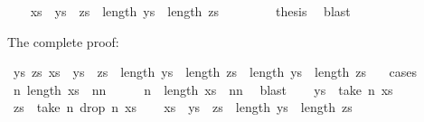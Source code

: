 \begin{isabellebody}
\ \ \isamarkupfalse%
\ {\isachardoublequoteopen}xs\ {\isacharequal}{\kern0pt}\ {\isacharquery}{\kern0pt}ys\ {\isacharat}{\kern0pt}\ {\isacharquery}{\kern0pt}zs\ {\isasymand}\ length\ {\isacharquery}{\kern0pt}ys\ {\isacharequal}{\kern0pt}\ length\ {\isacharquery}{\kern0pt}zs\ {\isacharplus}{\kern0pt}\ {}{\isachardoublequoteclose}\ \isamarkupfalse%
\isanewline
\ \ \isamarkupfalse%
\ \isamarkupfalse%
\ {\isacharquery}{\kern0pt}thesis\ \isamarkupfalse%
\ blast\isanewline
{}\isamarkupfalse%
%
\endisatagproof
{\isafoldproof}%
%
\isadelimproof
%
\endisadelimproof
%
\begin{isamarkuptext}%
The complete proof:%
\end{isamarkuptext}\isamarkuptrue%
\isamarkupfalse%
\ {\isachardoublequoteopen}{\isasymexists}ys\ zs{\isachardot}{\kern0pt}\ xs\ {\isacharequal}{\kern0pt}\ ys\ {\isacharat}{\kern0pt}\ zs\ {\isasymand}\ {\isacharparenleft}{\kern0pt}length\ ys\ {\isacharequal}{\kern0pt}\ length\ zs\ {\isasymor}\ length\ ys\ {\isacharequal}{\kern0pt}\ length\ zs\ {\isacharplus}{\kern0pt}\ {}{\isacharparenright}{\kern0pt}{\isachardoublequoteclose}\isanewline
%
\isadelimproof
%
\endisadelimproof
%
\isatagproof
{}\isamarkupfalse%
\ cases\isanewline
\ \ \isamarkupfalse%
\ {\isachardoublequoteopen}{\isasymexists}n{\isachardot}{\kern0pt}\ length\ xs\ {\isacharequal}{\kern0pt}\ n{\isacharplus}{\kern0pt}n{\isachardoublequoteclose}\isanewline
\ \ \isamarkupfalse%
\ \isamarkupfalse%
\ n\ \ {\isachardoublequoteopen}length\ xs\ {\isacharequal}{\kern0pt}\ n{\isacharplus}{\kern0pt}n{\isachardoublequoteclose}\ \isamarkupfalse%
\ blast\isanewline
\ \ \isamarkupfalse%
\ {\isacharquery}{\kern0pt}ys\ {\isacharequal}{\kern0pt}\ {\isachardoublequoteopen}take\ n\ xs{\isachardoublequoteclose}\isanewline
\ \ \isamarkupfalse%
\ {\isacharquery}{\kern0pt}zs\ {\isacharequal}{\kern0pt}\ {\isachardoublequoteopen}take\ n\ {\isacharparenleft}{\kern0pt}drop\ n\ xs{\isacharparenright}{\kern0pt}{\isachardoublequoteclose}\isanewline
\ \ \isamarkupfalse%
\ {\isachardoublequoteopen}xs\ {\isacharequal}{\kern0pt}\ {\isacharquery}{\kern0pt}ys\ {\isacharat}{\kern0pt}\ {\isacharquery}{\kern0pt}zs\ {\isasymand}\ length\ {\isacharquery}{\kern0pt}ys\ {\isacharequal}{\kern0pt}\ length\ {\isacharquery}{\kern0pt}zs{\isachardoublequoteclose}\isanewline
\ \ \ \ \isamarkupfalse%

\end{isabellebody}
